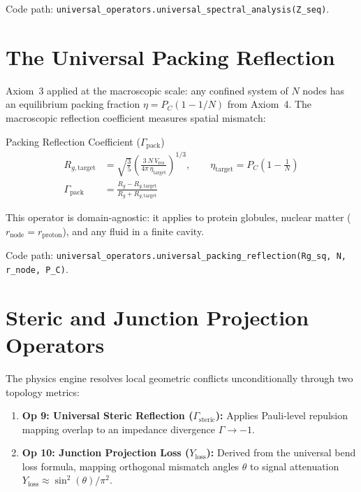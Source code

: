 Code path: \texttt{universal\_operators.universal\_spectral\_analysis(Z\_seq)}.

\section{The Universal Packing Reflection}
\label{sec:universal_packing}

Axiom~3 applied at the macroscopic scale: any confined system of $N$
nodes has an equilibrium packing fraction $\eta = P_C(1 - 1/N)$ from
Axiom~4.  The macroscopic reflection coefficient measures spatial
mismatch:
\begin{resultbox}{Packing Reflection Coefficient ($\Gamma_\text{pack}$)}
\begin{align}
    R_{g,\text{target}} &= \sqrt{\tfrac{3}{5}}\left(
      \frac{3\,N\,V_\text{res}}{4\pi\,\eta_\text{target}}
    \right)^{1/3}, \qquad
    \eta_\text{target} = P_C\!\left(1 - \frac{1}{N}\right)
    \label{eq:rg_target} \\[4pt]
    \Gamma_\text{pack} &= \frac{R_g - R_{g,\text{target}}}
                              {R_g + R_{g,\text{target}}}
    \label{eq:gamma_pack}
\end{align}
\end{resultbox}

This operator is domain-agnostic: it applies to protein globules,
nuclear matter ($r_\text{node} = r_\text{proton}$), and any fluid in a
finite cavity.

Code path: \texttt{universal\_operators.universal\_packing\_reflection(Rg\_sq, N, r\_node, P\_C)}.

\section{Steric and Junction Projection Operators}
\label{sec:steric_and_junction}

The physics engine resolves local geometric conflicts unconditionally through two topology metrics:
\begin{enumerate}
    \item \textbf{Op 9: Universal Steric Reflection ($\Gamma_\text{steric}$):} Applies Pauli-level repulsion mapping overlap to an impedance divergence $\Gamma \to -1$\gammaundeclared{}.
    \item \textbf{Op 10: Junction Projection Loss ($Y_\text{loss}$):} Derived from the universal bend loss formula, mapping orthogonal mismatch angles $\theta$ to signal attenuation $Y_\text{loss} \approx \sin^2(\theta) / \pi^2$.
\end{enumerate}

